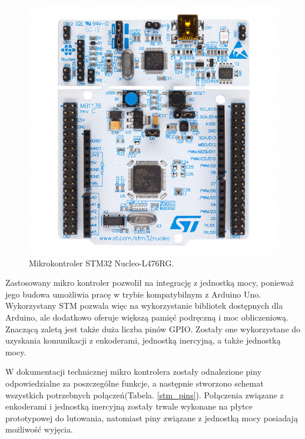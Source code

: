 \begin{figure}[ht]
	\centering
	\includegraphics[scale=0.40]{stm32.png}
	\caption{Mikrokontroler STM32 Nucleo-L476RG.}
	\label{fig:stm32}
\end{figure}

Zastosowany mikro kontroler pozwolił na integrację z jednostką mocy, ponieważ jego budowa umożliwia pracę w trybie kompatybilnym z Arduino Uno. Wykorzystany STM pozwala więc na wykorzystanie bibliotek dostępnych dla Arduino, ale dodatkowo oferuje większą pamięć podręczną i moc obliczeniową. Znaczącą zaletą jest także duża liczba pinów GPIO. Zostały one wykorzystane do uzyskania komunikacji z enkoderami, jednostką inercyjną, a także jednostką mocy. 

W dokumentacji technicznej mikro kontrolera zostały odnalezione piny odpowiedzialne za poszczególne funkcje, a następnie stworzono schemat wszystkich potrzebnych połączeń(Tabela. \ref{stm_pins}). Połączenia związane z enkoderami i jednostką inercyjną zostały trwale wykonane na płytce prototypowej do lutowania, natomiast piny związane z jednostką mocy posiadają możliwość wyjęcia.  

